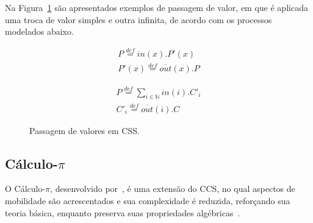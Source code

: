 Na Figura~\ref{fig:ccs_value} são apresentados exemplos de passagem de valor, em que é aplicada uma troca de valor simples e outra infinita, de acordo com os processos modelados abaixo.

\begin{equation}
\begin{align*}
P \stackrel{def}{=} in(x).P'(x) \\
P'(x) \stackrel{def}{=} \overline{out}(x).P
\end{align*}
\end{equation}

\begin{equation}
\begin{align*}
P \stackrel{def}{=} \sum_{i \in \mathbb{N}} in(i).C'_{i} \\
C'_{i} \stackrel{def}{=} \overline{out}(i).C
\end{align*}
\end{equation}

\begin{figure}[ht]
	\centering
{}
	\caption{Passagem de valores em CSS.
		\label{fig:ccs_value}}
\end{figure}
\FloatBarrier 

\subsection{Cálculo-$\pi$}

O Cálculo-$\pi$, desenvolvido por~\citeauthor{milner1992calculus}, é uma extensão do CCS, no qual aspectos de mobilidade são acrescentados e sua complexidade é reduzida, reforçando sua teoria básica, enquanto preserva suas propriedades algébricas~\cite{milner1992calculus}.

